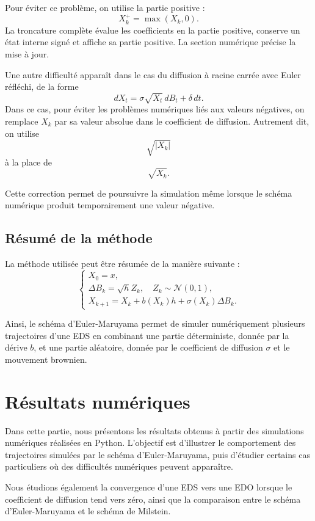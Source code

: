 \documentclass[12pt,a4paper]{article}
\theoremstyle{remark}
\begin{document}
Pour éviter ce problème, on utilise la partie positive :
\[
X_k^+ = \max(X_k,0).
\]
La troncature complète évalue les coefficients en la partie positive, conserve un état interne signé et affiche sa partie positive. La section numérique précise la mise à jour.

Une autre difficulté apparaît dans le cas du diffusion à racine carrée avec Euler réfléchi, de la forme
\[
dX_t = \sigma\sqrt{X_t}\,dB_t + \delta\,dt.
\]
Dans ce cas, pour éviter les problèmes numériques liés aux valeurs négatives, on remplace $X_k$ par sa valeur absolue dans le coefficient de diffusion. Autrement dit, on utilise
\[
\sqrt{|X_k|}
\]
à la place de
\[
\sqrt{X_k}.
\]

Cette correction permet de poursuivre la simulation même lorsque le schéma numérique produit temporairement une valeur négative.

\subsection{Résumé de la méthode}

La méthode utilisée peut être résumée de la manière suivante :
\[
\begin{cases}
X_0=x,\\[0.2cm]
\Delta B_k = \sqrt{h}Z_k,\quad Z_k\sim\mathcal{N}(0,1),\\[0.2cm]
X_{k+1}=X_k+b(X_k)h+\sigma(X_k)\Delta B_k.
\end{cases}
\]

Ainsi, le schéma d’Euler-Maruyama permet de simuler numériquement plusieurs trajectoires d’une EDS en combinant une partie déterministe, donnée par la dérive $b$, et une partie aléatoire, donnée par le coefficient de diffusion $\sigma$ et le mouvement brownien.


\section{Résultats numériques}

Dans cette partie, nous présentons les résultats obtenus à partir des simulations numériques réalisées en Python. L’objectif est d’illustrer le comportement des trajectoires simulées par le schéma d’Euler-Maruyama, puis d’étudier certains cas particuliers où des difficultés numériques peuvent apparaître.

Nous étudions également la convergence d’une EDS vers une EDO lorsque le coefficient de diffusion tend vers zéro, ainsi que la comparaison entre le schéma d’Euler-Maruyama et le schéma de Milstein.
\end{document}

